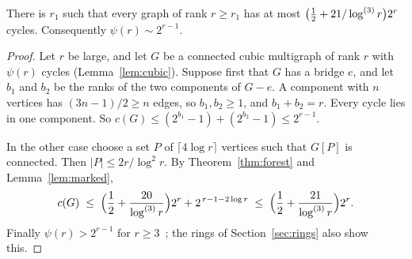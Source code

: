 \begin{corollary}\label{cor:cycles}
There is $r_1$ such that every graph of rank $r\ge r_1$ has at most
$\bigl(\tfrac12+21/\log^{(3)}r\bigr)2^{r}$ cycles. Consequently $\psi(r)\sim2^{r-1}$.
\end{corollary}

\begin{proof}
Let $r$ be large, and let $G$ be a connected cubic multigraph of rank $r$ with $\psi(r)$ cycles
(Lemma~\ref{lem:cubic}). Suppose first that $G$ has a bridge $e$, and let $b_1$ and $b_2$ be the
ranks of the two components of $G-e$. A component with $n$ vertices has $(3n-1)/2\ge n$ edges, so
$b_1,b_2\ge1$, and $b_1+b_2=r$. Every cycle lies in one component. So
$c(G)\le(2^{b_1}-1)+(2^{b_2}-1)\le2^{r-1}$.

In the other case choose a set $P$ of $\lceil4\log r\rceil$ vertices such that $G[P]$ is
connected. Then $|P|\le2r/\log^{2}r$. By Theorem~\ref{thm:forest} and Lemma~\ref{lem:marked},
\[
  c(G)\;\le\;\Bigl(\frac12+\frac{20}{\log^{(3)}r}\Bigr)2^{r}+2^{\,r-1-2\log r}
  \;\le\;\Bigl(\frac12+\frac{21}{\log^{(3)}r}\Bigr)2^{r}.
\]
Finally $\psi(r)>2^{r-1}$ for $r\ge3$~\cite{ES}; the rings of Section~\ref{sec:rings} also show this.
\end{proof}
